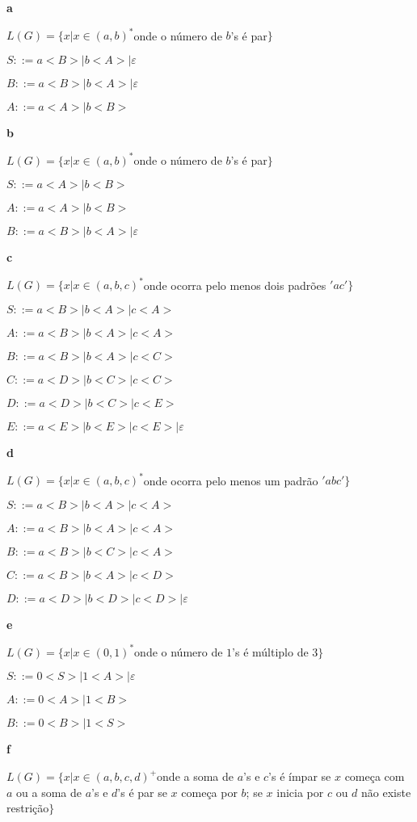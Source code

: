 \documentclass[ ]{article}
\begin{document}
	\textbf{a}
	
	$L(G) = \{x | x \in (a,b)^*$onde o número de $b$'s é par$\}$
	
	$S::= a<B> | b<A> | \varepsilon$
	
	$B::= a<B> | b<A> | \varepsilon$ %
	
	$A::= a<A> | b <B> $ %
	
	\textbf{b}
	
	$L(G) = \{x | x \in (a,b)^*$onde o número de $b$'s é par$\}$
	
	$S::= a<A> | b<B> $ %
	
	$A::= a<A> | b<B>$ %
	
	$B::= a<B>| b<A> | \varepsilon$ %
	
	\textbf{c}
	
	$L(G) = \{ x|x \in (a,b,c)^*$onde ocorra pelo menos dois padrões $'ac'\}$
	
	$S::= a<B> | b<A> | c<A>$
	
	$A::= a<B> | b<A> | c<A>$ %
	
	$B::= a<B> | b<A> | c<C>$ %
	
	$C::= a<D> | b<C> | c<C>$ %
	
	$D::= a<D> | b<C> | c<E>$ %
	
	$E::= a<E> | b<E> | c<E> | \varepsilon$
	
	\textbf{d}
	
	$L(G) = \{ x|x \in (a,b,c)^*$onde ocorra pelo menos um padrão $'abc'\}$
	
	$S::= a<B> | b<A> | c<A>$ 

	$A::= a<B> | b<A> | c<A>$ %
	
	$B::= a<B> | b<C> | c<A>$ %
	
	$C::= a<B> | b<A> | c<D>$ %
	
	$D::= a<D> | b<D> | c<D> | \varepsilon$ %
	
	\textbf{e}
	
	$L(G) = \{ x|x \in (0,1)^*$onde o número de $1$'s é múltiplo de $3\}$
	
	$S::= 0<S> | 1<A> | \varepsilon$%
	
	$A::= 0<A> | 1<B>$ %
	
	$B::= 0<B> | 1<S> $ %
	
	\textbf{f}
	
	$L(G) = \{ x | x \in (a,b,c,d)^+$onde a soma de $a$'s e $c$'s é ímpar se $x$ começa com $a$ ou a soma de $a$'s e $d$'s é par se $x$ começa por $b$; se $x$ inicia por $c$ ou $d$ não existe restrição$\}$
	
\end{document}
